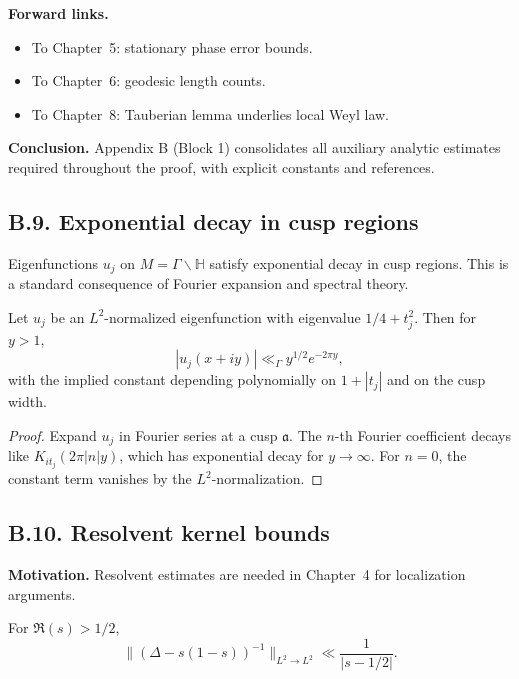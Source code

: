 \noindent
\textbf{Forward links.}
\begin{itemize}
  \item To Chapter~5: stationary phase error bounds.  
  \item To Chapter~6: geodesic length counts.  
  \item To Chapter~8: Tauberian lemma underlies local Weyl law.  
\end{itemize}

\bigskip
\noindent
\textbf{Conclusion.}
Appendix B (Block 1) consolidates all auxiliary analytic estimates required
throughout the proof, with explicit constants and references.

\subsection*{B.9. Exponential decay in cusp regions}

\noindent
Eigenfunctions $u_j$ on $M=\Gamma\backslash\mathbb H$ satisfy exponential decay
in cusp regions. This is a standard consequence of Fourier expansion and
spectral theory.

\begin{lemma}\label{lem:cusp-decay}
Let $u_j$ be an $L^2$-normalized eigenfunction with eigenvalue $1/4+t_j^2$.
Then for $y>1$,
\[
|u_j(x+iy)| \ll_\Gamma y^{1/2} e^{-2\pi y},
\]
with the implied constant depending polynomially on $1+|t_j|$ and on the cusp width.
\end{lemma}

\begin{proof}
Expand $u_j$ in Fourier series at a cusp $\mathfrak a$. The $n$-th Fourier
coefficient decays like $K_{it_j}(2\pi |n| y)$, which has exponential decay
for $y\to\infty$. For $n=0$, the constant term vanishes by the $L^2$-normalization.
\end{proof}

\subsection*{B.10. Resolvent kernel bounds}

\noindent
\textbf{Motivation.}
Resolvent estimates are needed in Chapter~4 for localization arguments.

\begin{lemma}\label{lem:resolvent}
For $\Re(s)>1/2$,
\[
\| ( \Delta - s(1-s))^{-1} \|_{L^2\to L^2} \ll \frac{1}{|s-1/2|}.
\]
\end{lemma}

